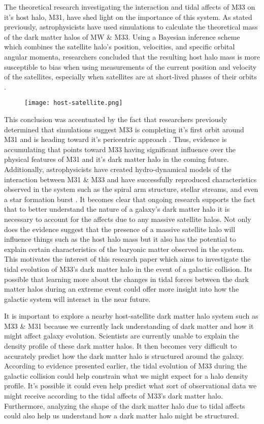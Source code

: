 \documentclass[fleqn,usenatbib]{mnras}
\begin{document}
The theoretical research investigating the interaction and tidal affects of M33 on it's host halo, M31, have shed light on the importance of this system. As stated previously, astrophysicists have used simulations to calculate the theoretical mass of the dark matter halos of MW \& M33. Using a Bayesian inference scheme which combines the satellite halo's position, velocities, and specific orbital angular momenta, researchers concluded that the resulting host halo mass is more susceptible to bias when using measurements of the current position and velocity of the satellites, especially when satellites are at short-lived phases of their orbits \citep{Patel17}.
\begin{figure}
	\texttt{[image: host-satellite.png]}
    \label{fig:host-satellite}
\end{figure}
This conclusion was accentuated by the fact that researchers previously determined that simulations suggest M33 is completing it's first orbit around M31 and is heading toward it's pericentric approach \citep{Patel16}. Thus, evidence is accumulating that points toward M33 having significant influence over the physical features of M31 and it's dark matter halo in the coming future. Additionally, astrophysicists have created hydro-dynamical models of the interaction between M31 \& M33 and have successfully reproduced characteristics observed in the system such as the spiral arm structure, stellar streams, and even a star formation burst \citep{Semczuk18}. It becomes clear that ongoing research supports the fact that to better understand the nature of a galaxy's dark matter halo it is necessary to account for the affects due to any massive satellite halos. Not only does the evidence suggest that the presence of a massive satellite halo will influence things such as the host halo mass but it also has the potential to explain certain characteristics of the baryonic matter observed in the system. This motivates the interest of this research paper which aims to investigate the tidal evolution of M33's dark matter halo in the event of a galactic collision. Its possible that learning more about the changes in tidal forces between the dark matter halos during an extreme event could offer more insight into how the galactic system will interact in the near future. 

It is important to explore a nearby host-satellite dark matter halo system such as M33 \& M31 because we currently lack understanding of dark matter and how it might affect galaxy evolution. Scientists are currently unable to explain the density profile of these dark matter halos. It then becomes very difficult to accurately predict how the dark matter halo is structured around the galaxy. According to evidence presented earlier, the tidal evolution of M33 during the galactic collision could help constrain what we might expect for a halo density profile. It's possible it could even help predict what sort of observational data we might receive according to the tidal affects of M33's dark matter halo. Furthermore, analyzing the shape of the dark matter halo due to tidal affects could also help us understand how a dark matter halo might be structured. 
\end{document}
